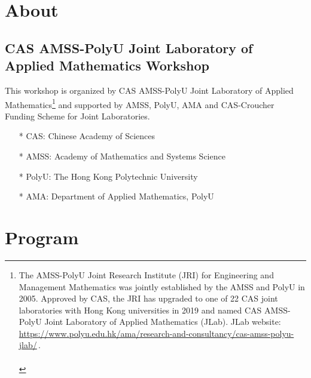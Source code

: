 \documentclass[
	openany, %
	parskip=full, %
	12pt, %
	a4paper, %
]{conferencebooklet} %
\begin{document}
\tableofcontents


\chapter{About}



\section{CAS AMSS-PolyU Joint Laboratory of Applied Mathematics Workshop}

This workshop is organized by CAS AMSS-PolyU  Joint Laboratory of Applied
Mathematics\footnote{The AMSS-PolyU Joint Research Institute (JRI) for Engineering and Management Mathematics was jointly established by the AMSS and PolyU in 2005. Approved by CAS, the JRI has upgraded to one of 22 CAS joint laboratories with Hong Kong universities in 2019 and named CAS AMSS-PolyU Joint Laboratory of Applied Mathematics (JLab).
JLab website:\\ \mbox{\url{https://www.polyu.edu.hk/ama/research-and-consultancy/cas-amss-polyu-jlab/}}\,.\\ \\ } and supported by AMSS, PolyU, AMA and CAS-Croucher Funding Scheme for Joint Laboratories.



\begin{center}
	\begin{itemize}
	    \item[*] CAS: Chinese Academy of Sciences
	    \item[*] AMSS: Academy of Mathematics and Systems Science
	    \item[*] PolyU: The Hong Kong Polytechnic University
	    \item[*] AMA: Department of Applied Mathematics, PolyU
	\end{itemize}
\end{center}



\chapter{Program}
\end{document}
